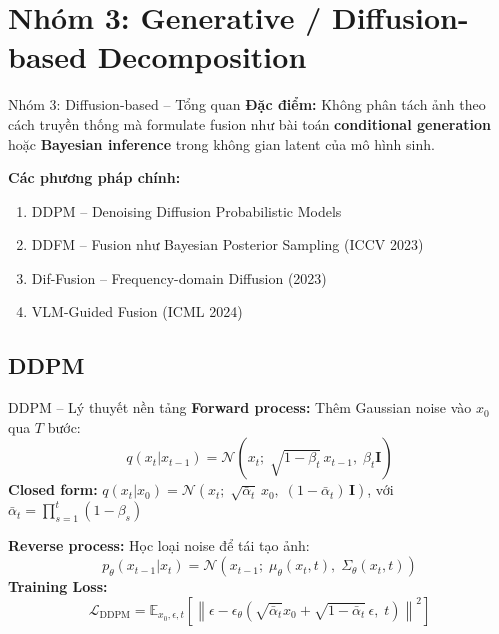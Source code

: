 \documentclass{beamer}
\begin{document}
\section{Nhóm 3: Generative / Diffusion-based Decomposition}

\begin{frame}{Nhóm 3: Diffusion-based -- Tổng quan}
    \textbf{Đặc điểm:} Không phân tách ảnh theo cách truyền thống mà formulate fusion như bài toán \textbf{conditional generation} hoặc \textbf{Bayesian inference} trong không gian latent của mô hình sinh.

    \vspace{0.3cm}
    \textbf{Các phương pháp chính:}
    \begin{enumerate}
        \item DDPM -- Denoising Diffusion Probabilistic Models
        \item DDFM -- Fusion như Bayesian Posterior Sampling (ICCV 2023)
        \item Dif-Fusion -- Frequency-domain Diffusion (2023)
        \item VLM-Guided Fusion (ICML 2024)
    \end{enumerate}
\end{frame}

\subsection{DDPM}

\begin{frame}{DDPM -- Lý thuyết nền tảng}
    \small
    \textbf{Forward process:} Thêm Gaussian noise vào $x_0$ qua $T$ bước:
    \vspace{-0.15cm}
    \begin{equation}
        q(x_t | x_{t-1}) = \mathcal{N}\!\left(x_t;\; \sqrt{1-\beta_t}\, x_{t-1},\; \beta_t \mathbf{I}\right)
    \end{equation}
    \vspace{-0.25cm}
    \textbf{Closed form:} $q(x_t | x_0) = \mathcal{N}\!\left(x_t;\; \sqrt{\bar{\alpha}_t}\, x_0,\; (1-\bar{\alpha}_t)\, \mathbf{I}\right)$, \; với $\bar{\alpha}_t = \prod_{s=1}^{t} (1 - \beta_s)$

    \vspace{0.15cm}
    \textbf{Reverse process:} Học loại noise để tái tạo ảnh:
    \vspace{-0.15cm}
    \begin{equation}
        p_\theta(x_{t-1}|x_t) = \mathcal{N}\!\left(x_{t-1};\; \mu_\theta(x_t,t),\; \Sigma_\theta(x_t,t)\right)
    \end{equation}
    \vspace{-0.2cm}
    \textbf{Training Loss:}
    \vspace{-0.1cm}
    \begin{equation}
        \mathcal{L}_{\text{DDPM}} = \mathbb{E}_{x_0, \epsilon, t}\!\left[\left\|\epsilon - \epsilon_\theta\!\left(\sqrt{\bar{\alpha}_t} x_0 + \sqrt{1-\bar{\alpha}_t}\,\epsilon,\; t\right)\right\|^2\right]
    \end{equation}
\end{frame}
\end{document}

